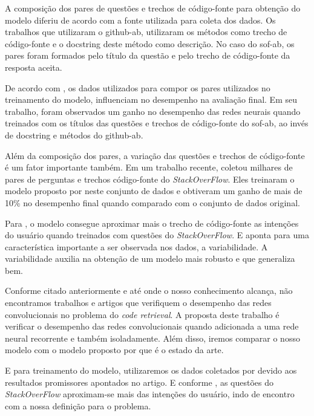 A composição dos pares de questões e trechos de código-fonte para obtenção do modelo diferiu de acordo com a fonte utilizada para coleta dos dados. Os trabalhos que utilizaram o \acrfull{github-ab}, utilizaram os métodos como trecho de código-fonte e o \gls{docstring} deste método como descrição. No caso do \acrfull{sof-ab}, os pares foram formados pelo título da questão e pelo trecho de código-fonte da resposta aceita.

De acordo com \cite{cambronero-deep-learning-code-search:2019}, os dados utilizados para compor os pares utilizados no treinamento do modelo, influenciam no desempenho na avaliação final. Em seu trabalho, foram observados um ganho no desempenho das redes neurais quando treinados com os títulos das questões e trechos de código-fonte do \acrfull{sof-ab}, ao invés de \gls{docstring} e métodos do \acrfull{github-ab}. 

Além da composição dos pares, a variação das questões e trechos de código-fonte é um fator importante também. Em um trabalho recente, \cite{yao-2018} coletou milhares de pares de perguntas e trechos código-fonte do \textit{StackOverFlow}. Eles treinaram o modelo proposto por \cite{iyer-etal-2016-summarizing} neste conjunto de dados e obtiveram um ganho de mais de 10\% no desempenho final quando comparado com o conjunto de dados original.

Para \cite{cambronero-deep-learning-code-search:2019}, o modelo consegue aproximar mais o trecho de código-fonte as intenções do usuário quando treinados com questões do \textit{StackOverFlow}. E \cite{yao-2018} aponta para uma característica importante a ser observada nos dados, a variabilidade. A variabilidade auxilia na obtenção de um modelo mais robusto e que generaliza bem.

Conforme citado anteriormente e até onde o nosso conhecimento alcança, não encontramos trabalhos e artigos que verifiquem o desempenho das redes convolucionais no problema do \textit{code retrieval}. A proposta deste trabalho é verificar o desempenho das redes convolucionais quando adicionada a uma rede neural recorrente e também isoladamente. Além disso, iremos comparar o nosso modelo com o modelo proposto por \cite{cambronero-deep-learning-code-search:2019} que é o estado da arte.

E para treinamento do modelo, utilizaremos os dados coletados por \cite{yao-2018} devido aos resultados promissores apontados no artigo. E conforme \cite{cambronero-deep-learning-code-search:2019}, as questões do \textit{StackOverFlow} aproximam-se mais das intenções do usuário, indo de encontro com a nossa definição para o problema.